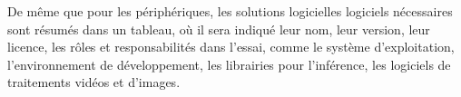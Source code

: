 ﻿\noindent De même que pour les périphériques, les solutions logicielles logiciels nécessaires sont résumés dans un tableau, où il sera indiqué leur nom, leur version, leur licence, les rôles et responsabilités dans l'essai, comme le système d'exploitation, l'environnement de développement, les librairies pour l'inférence, les logiciels de traitements vidéos et d'images.
